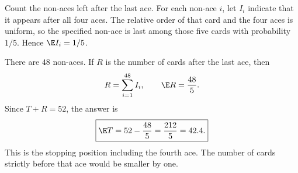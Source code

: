 Count the non-aces left after the last ace. For each non-ace $i$, let $I_i$ indicate that it appears after all four aces. The relative order of that card and the four aces is uniform, so the specified non-ace is last among those five cards with probability $1/5$. Hence $\E I_i=1/5$.

There are $48$ non-aces. If $R$ is the number of cards after the last ace, then
\[
R=\sum_{i=1}^{48}I_i,\qquad \E R=\frac{48}{5}.
\]
Since $T+R=52$, the answer is
\[
\boxed{\E T=52-\frac{48}{5}=\frac{212}{5}=42.4.}
\]
This is the stopping position including the fourth ace. The number of cards strictly before that ace would be smaller by one.
